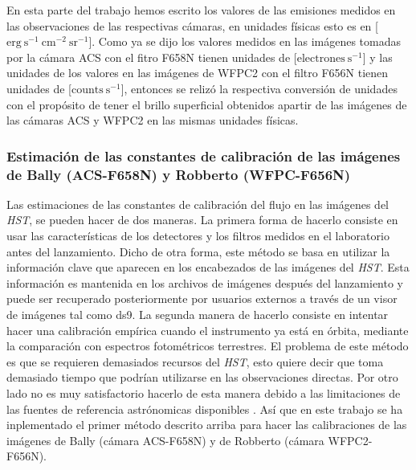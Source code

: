 \label{sec:const}
En esta parte del trabajo hemos escrito los valores de las emisiones medidos en las observaciones de las respectivas cámaras, en unidades físicas esto es en [\(\mathrm{erg\ s^{-1}\ cm^{-2}\ sr^{-1}}\)]. Como ya se dijo los valores medidos en las imágenes tomadas por la cámara ACS con el fitro F658N tienen unidades de [\(\mathrm{electrones\ s^{-1}}\)] y las unidades de los valores en las imágenes de WFPC2 con el filtro F656N tienen unidades de [\(\text{counts}\ \text{s}^{-1}\)], entonces se relizó la respectiva conversión de unidades con el propósito de tener el brillo superficial obtenidos apartir de las imágenes de las cámaras ACS y WFPC2 en las mismas unidades físicas.\\


\subsubsection{Estimación de las constantes de calibración de las imágenes de Bally (ACS-F658N) y Robberto (WFPC-F656N)}
\label{sec:acs}

Las estimaciones de las constantes de calibración del flujo en las imágenes del \textit{HST}, se pueden hacer de dos maneras. La primera forma de hacerlo consiste en usar las características de los detectores y los filtros medidos en el laboratorio antes del lanzamiento. Dicho de otra forma, este método se basa en utilizar la información clave que aparecen en los encabezados de las imágenes del \textit{HST}. Esta información es mantenida en los archivos de imágenes después del lanzamiento y puede ser recuperado posteriormente por usuarios externos  a través de un visor de imágenes tal como ds9. La segunda manera de hacerlo consiste en intentar hacer una calibración empírica cuando el instrumento ya está en órbita, mediante la comparación con espectros fotométricos terrestres. El problema de este método es que se requieren demasiados recursos del \textit{HST}, esto quiere decir que toma demasiado tiempo que podrían utilizarse en las observaciones directas. Por otro lado no es muy satisfactorio hacerlo de esta manera debido a las limitaciones de las fuentes de referencia astrónomicas disponibles \citep{McMaster:2008}. Así que en este trabajo se ha inplementado el primer método descrito arriba para hacer las calibraciones de las imágenes de Bally (cámara ACS-F658N) y de Robberto (cámara WFPC2-F656N).\\     

